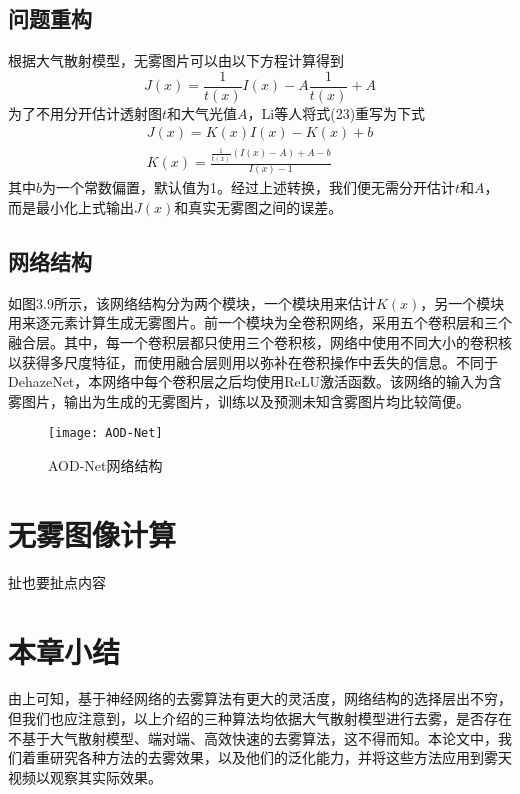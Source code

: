 \documentclass[a4paper, 12pt, oneside]{report}
\begin{document}
{\subsection{问题重构\quad}
根据大气散射模型，无雾图片可以由以下方程计算得到
\begin{equation}
J(x) = \frac{1}{t(x)}I(x) - A\frac{1}{t(x)} + A
\end{equation}
为了不用分开估计透射图$t$和大气光值$A$，Li等人将式(23)重写为下式
\begin{equation}
\begin{aligned}
J(x) = K(x)I(x) - K(x) + b \\
K(x) = \frac{\frac{1}{t(x)}(I(x) - A) + A - b}{I(x) - 1}
\end{aligned}
\end{equation}
其中$b$为一个常数偏置，默认值为1。经过上述转换，我们便无需分开估计$t$和$A$，而是最小化上式输出$J(x)$和真实无雾图之间的误差。

\subsection{网络结构\quad}

如图3.9所示，该网络结构分为两个模块，一个模块用来估计$K(x)$，另一个模块用来逐元素计算生成无雾图片。前一个模块为全卷积网络，采用五个卷积层和三个融合层。其中，每一个卷积层都只使用三个卷积核，网络中使用不同大小的卷积核以获得多尺度特征，而使用融合层则用以弥补在卷积操作中丢失的信息。不同于DehazeNet，本网络中每个卷积层之后均使用ReLU激活函数。该网络的输入为含雾图片，输出为生成的无雾图片，训练以及预测未知含雾图片均比较简便。
\begin{figure}[H]
\centering
\texttt{[image: AOD-Net]}
\caption{AOD-Net网络结构}
\end{figure}

\section{无雾图像计算\quad}
{\Large 扯也要扯点内容}

\section{本章小结\quad}
	由上可知，基于神经网络的去雾算法有更大的灵活度，网络结构的选择层出不穷，但我们也应注意到，以上介绍的三种算法均依据大气散射模型进行去雾，是否存在不基于大气散射模型、端对端、高效快速的去雾算法，这不得而知。本论文中，我们着重研究各种方法的去雾效果，以及他们的泛化能力，并将这些方法应用到雾天视频以观察其实际效果。

}
\end{document}
